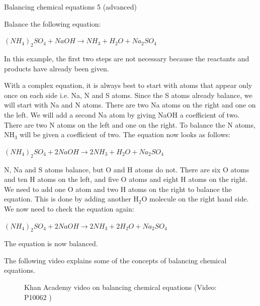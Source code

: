  \begin{wex}{Balancing chemical equations 5 (advanced)}{Balance the following equation:

\begin{center}
\rm${(NH_{4})_{2}SO_{4} + NaOH \rightarrow NH_{3} + H_{2}O + Na_{2}SO_{4}}$
\end{center}

In this example, the first two steps are not necessary because the reactants and products have already been given.\\
}

{
With a complex equation, it is always best to start with atoms that appear only once on each side i.e. Na, N and S atoms. Since the S atoms already balance, we will start with Na and N atoms. There are two Na atoms on the right and one on the left. We will add a second Na atom by giving NaOH a coefficient of two. There are two N atoms on the left and one on the right. To balance the N atoms, NH$_{3}$ will be given a coefficient of two. The equation now looks as follows:

\begin{center}
\rm${(NH_{4})_{2}SO_{4} + 2NaOH \rightarrow 2NH_{3} + H_{2}O + Na_{2}SO_{4}}$\\
\end{center}
}

{
N, Na and S atoms balance, but O and H atoms do not. There are six O atoms and ten H atoms on the left, and five O atoms and eight H atoms on the right. We need to add one O atom and two H atoms on the right to balance the equation. This is done by adding another H$_{2}$O molecule on the right hand side. We now need to check the equation again:

\begin{center}
\rm${(NH_{4})_{2}SO_{4} + 2NaOH \rightarrow 2NH_{3} + 2H_{2}O + Na_{2}SO_{4}}$\\
\end{center}

The equation is now balanced.
}
\end{wex}
    \noindent
\label{m38727*eip-44}The following video explains some of the concepts of balancing chemical equations.\newline
    \setcounter{subfigure}{0}
	\begin{figure}[H] %
    \textnormal{Khan Academy video on balancing chemical equations}\vspace{.1in} \nopagebreak
  \label{m38727*yt-media1}\label{m38727*yt-video1}
             { (Video:  P10062 )}
      \vspace{2pt}
    \vspace{.1in}
 \end{figure}       \par \label{m38727*secfhsst!!!underscore!!!id1261}
